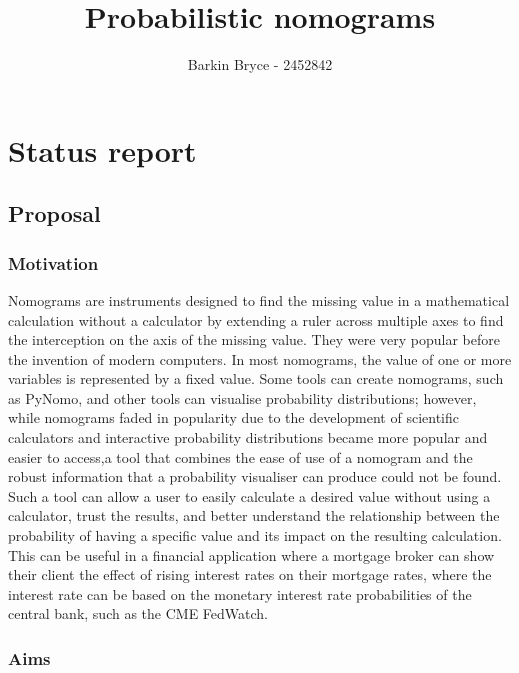 \documentclass[11pt]{article}
\title{Probabilistic nomograms}
\author{Barkin Bryce - 2452842}
\begin{document}
    \maketitle
    
    
     

\section{Status report}

\subsection{Proposal}\label{proposal}

\subsubsection{Motivation}\label{motivation} 



Nomograms are instruments designed to find the missing value in a mathematical calculation without a calculator by extending a ruler across multiple axes to find the interception on the axis of the missing value. They were very popular before the invention of modern computers. In most nomograms, the value of one or more variables is represented by a fixed value. 
Some tools can create nomograms, such as PyNomo, and other tools can visualise probability distributions; however, while nomograms faded in popularity due to the development of scientific calculators and interactive probability distributions became more popular and easier to access,a tool that combines the ease of use of a nomogram and the robust information that a probability visualiser can produce could not be found. Such a tool can allow a user to easily calculate a desired value without using a calculator, trust the results, and better understand the relationship between the probability of having a specific value and its impact on the resulting calculation. This can be useful in a financial application where a mortgage broker can show their client the effect of rising interest rates on their mortgage rates, where the interest rate can be based on the monetary interest rate probabilities of the central bank, such as the CME FedWatch.           


\subsubsection{Aims}\label{aims}
\end{document}
